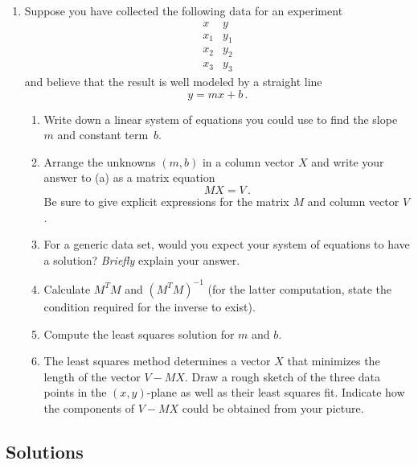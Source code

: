 \begin{enumerate}
\item Suppose you have collected the following data for an experiment
$$
\begin{array}{l|l}
x&y\\\hline
x_1&y_1\\
x_2&y_2\\
x_3&y_3
\end{array}
$$
and believe that the result is well modeled by a straight line
$$
y=mx+b\, .
$$
\begin{enumerate}
\item Write down a linear system of equations you could use to find the slope $m$ and constant term~$b$. 
\item Arrange the unknowns $(m,b)$ in a column vector $X$ and write your answer to (a) as a matrix equation $$M X= V\, .$$
Be sure to give explicit expressions for the matrix $M$ and column vector $V$.
\item For a generic data set, would you expect your system of equations to have a solution? {\it Briefly} explain your answer.
\item Calculate $M^T M$ and $(M^T M)^{-1}$ (for the latter computation, state the condition required for the inverse to exist).
\item Compute the least squares solution for $m$ and $b$.
\item The least squares method determines a vector $X$ that minimizes the length of the vector $V-MX$. Draw a rough sketch of
the three data points in the $(x,y)$-plane as well as their least squares fit. 
Indicate how the components of $V-MX$ could be obtained from your picture.

\end{enumerate}

\end{enumerate}

\subsection*{Solutions}

